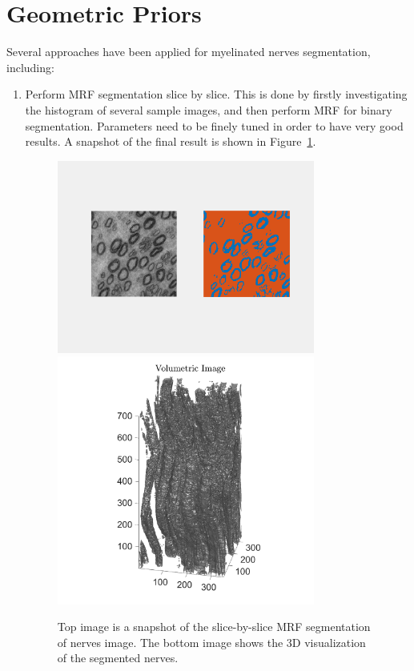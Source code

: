 \documentclass[a4paper]{article}
\begin{document}
	\section{Geometric Priors}
	Several approaches have been applied for myelinated nerves segmentation, including:
	\begin{enumerate}
	\item Perform MRF segmentation slice by slice. This is done by firstly investigating the histogram of several sample images, and then perform MRF for binary segmentation. Parameters need to be finely tuned in order to have very good results. A snapshot of the final result is shown in Figure~\ref{final1}.
	\begin{figure}[!b]
	\centering
	\includegraphics[width=0.8\textwidth]{./figures/1.png}
	\includegraphics[width=0.8\textwidth]{./figures/final_res1.png}
    \caption{Top image is a snapshot of the slice-by-slice MRF segmentation of nerves image. The bottom image shows the 3D visualization of the segmented nerves.}
	\label{final1}
\end{figure}
	

\end{enumerate}
\end{document}
